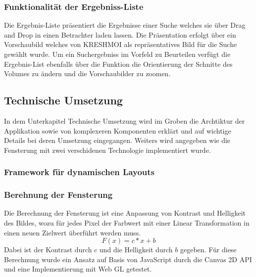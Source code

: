 \subsubsection{Funktionalität der Ergebniss-Liste}
\label{sec:Funktionalität der Ergebniss-Liste}
Die Ergebnis-Liste präsentiert die Ergebnisse einer Suche welches sie über Drag and Drop in einen Betrachter laden lassen.
Die Präsentation erfolgt über ein Vorschaubild welches von KRESHMOI als repräsentatives Bild für die Suche gewählt wurde.
Um ein Suchergebniss im Vorfeld zu Beurteilen verfügt die Ergebnis-List ebenfalls über die Funktion die Orientierung der Schnitte des Volumes zu ändern und die Vorschaubilder zu zoomen.

\subsection{Technische Umsetzung}
\label{sec:Technische Umsetzung}
In dem Unterkapitel Technische Umsetzung wird im Groben die Archtiktur der Applikation sowie von komplexeren Komponenten erklärt und auf wichtige Details bei deren Umsetzung eingegangen.
Weiters wird angegeben wie die Fensterung mit zwei verschidenen Technologie implementiert wurde.

\subsubsection{Framework für dynamischen Layouts}
\label{sec:Umsetzung der dynamischen Layouts}

\subsubsection{Berehnung der Fensterung}
\label{sec:Berehnung der Fensterung}
Die Berechnung der Fensterung ist eine Anpassung von Kontrast und Helligkeit des Bildes,
wozu für jedes Pixel der Farbwert mit einer Linear Transformation in einen neuen Zielwert überführt werden muss.
\begin{equation}
        F(x) = c*x + b
\end{equation}
Dabei ist der Kontrast durch $c$ und die Helligkeit durch $b$ gegeben.
Für diese Berechnung wurde ein Ansatz auf Basis von JavaScript durch die Canvas 2D API und eine Implementierung mit Web GL getestet.

